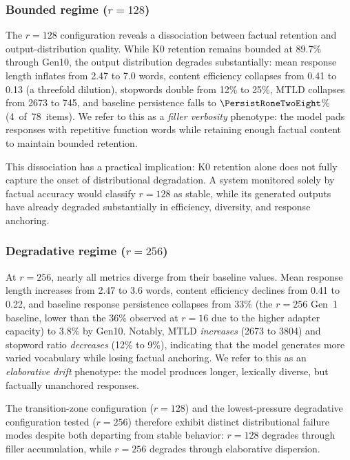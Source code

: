 \documentclass[a4paper,fleqn]{cas-dc}
\newif\ifshowchanges
\newcommand{\rev}[1]{\ifshowchanges{\color{blue}#1}\else{#1}\fi}
\begin{document}
\subsubsection{Bounded regime ($r=128$)}\label{sec:dissociation}
The $r=128$ configuration reveals a dissociation between factual retention and
output-distribution quality. While K0 retention remains bounded at 89.7\% through
Gen10, the output distribution degrades substantially: mean response length
inflates from 2.47 to 7.0 words, content efficiency collapses from 0.41 to 0.13
(a threefold dilution), stopwords double from 12\% to 25\%, MTLD collapses from
2673 to 745, and baseline persistence falls to \rev{$\PersistRoneTwoEight$\% (4~of~78~items)}. We refer to this as a
\textit{filler verbosity} phenotype: the model pads responses with repetitive
function words while retaining enough factual content to maintain bounded
retention.

This dissociation has a practical implication: K0 retention alone does not fully
capture the onset of distributional degradation. A system monitored solely by
factual accuracy would classify $r=128$ as stable, while its generated outputs
have already degraded substantially in efficiency, diversity, and response
anchoring.

\subsubsection{Degradative regime ($r=256$)}
At $r=256$, nearly all metrics diverge from their baseline values. Mean response
length increases from 2.47 to 3.6 words, content efficiency declines from 0.41
to 0.22, and baseline response persistence collapses from \rev{33\% (the $r=256$ Gen~1 baseline, lower than the 36\% observed at $r=16$ due to the higher adapter capacity)} to 3.8\% by
Gen10. Notably, MTLD \textit{increases} (2673 to 3804) and stopword ratio
\textit{decreases} (12\% to 9\%), indicating that the model generates more
varied vocabulary while losing factual anchoring. We refer to this as an
\textit{elaborative drift} phenotype: the model produces longer, lexically
diverse, but factually unanchored responses.

\rev{The transition-zone configuration ($r=128$) and the lowest-pressure degradative configuration tested ($r=256$) therefore exhibit distinct distributional failure modes despite both departing from stable behavior: $r=128$ degrades through filler accumulation, while $r=256$ degrades through elaborative dispersion.}
\end{document}
